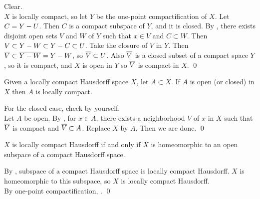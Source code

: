 \pf \note{\mimpd} Clear. \\
\note{\mimp} \(X\) is locally compact, so let \(Y\) be the one-point compactification of \(X\). Let \(C = Y - U\). Then \(C\) is a compact subspace of \(Y\), and it is closed. By , there exists disjoint open sets \(V\) and \(W\) of \(Y\) such that \(x \in V\) and \(C \subset W\). Then \(V \subset Y - W \subset Y - C \subset U\). Take the closure of \(V\) in \(Y\). Then \(\overline{V} \subset \overline{Y - W} = Y - W\), so \(\overline{V} \subset U\). Also \(\overline{V}\) is a closed subset of a compact space \(Y\), so it is compact, and \(X\) is open in \(Y\) so \(\overline{V}\) is compact in \(X\). \qed

 Given a locally compact Hausdorff space \(X\), let \(A \subset X\). If \(A\) is open (or closed) in \(X\) then \(A\) is locally compact.

\pf For the closed case, check by yourself. \\
Let \(A\) be open. By , for \(x \in A\), there exists a neighborhood \(V\) of \(x\) in \(X\) such that \(\overline{V}\) is compact and \(\overline{V} \subset A\). Replace \(X\) by \(A\). Then we are done. \qed

 \(X\) is locally compact Hausdorff if and only if \(X\) is homeomorphic to an open subspace of a compact Hausdorff space.

\pf \note{\mimpd} By , subspace of a compact Hausdorff space is locally compact Hausdorff. \(X\) is homeomorphic to this subspace, so \(X\) is locally compact Hausdorff. \\
\note{\mimp} By one-point compactification, . \qed

\pagebreak
